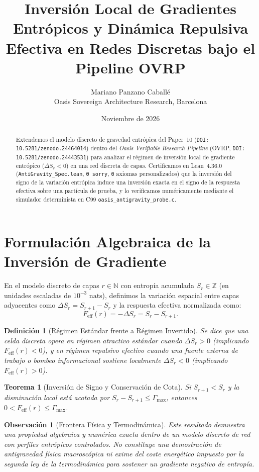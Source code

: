 \documentclass[11pt,a4paper]{article}
\title{Inversi\'on Local de Gradientes Entr\'opicos y Din\'amica Repulsiva Efectiva en Redes Discretas bajo el Pipeline OVRP}
\author{Mariano Panzano Caball\'e \\ \small Oasis Sovereign Architecture Research, Barcelona}
\date{Noviembre de 2026}
\newtheorem{definition}{Definici\'on}
\newtheorem{theorem}{Teorema}
\newtheorem{remark}{Observaci\'on}
\begin{document}
\maketitle

\begin{abstract}
Extendemos el modelo discreto de gravedad entr\'opica del Paper~10 (\texttt{DOI: 10.5281/zenodo.24464014}) dentro del \emph{Oasis Verifiable Research Pipeline} (OVRP, \texttt{DOI: 10.5281/zenodo.24443531}) para analizar el r\'egimen de inversi\'on local de gradiente entr\'opico ($\Delta S_r < 0$) en una red discreta de capas. Certificamos en Lean~4.36.0 (\texttt{AntiGravity\_Spec.lean}, \texttt{0 sorry}, \texttt{0} axiomas personalizados) que la inversi\'on del signo de la variaci\'on entr\'opica induce una inversi\'on exacta en el signo de la respuesta efectiva sobre una part\'icula de prueba, y lo verificamos num\'ericamente mediante el simulador determinista en C99 \texttt{oasis\_antigravity\_probe.c}.
\end{abstract}

\section{Formulación Algebraica de la Inversión de Gradiente}
En el modelo discreto de capas $r \in \mathbb{N}$ con entrop\'ia acumulada $S_r \in \mathbb{Z}$ (en unidades escaladas de $10^{-3}\text{ nats}$), definimos la variaci\'on espacial entre capas adyacentes como $\Delta S_r = S_{r+1} - S_r$ y la respuesta efectiva normalizada como:
\[
F_{\mathrm{eff}}(r) = -\Delta S_r = S_r - S_{r+1}.
\]

\begin{definition}[Régimen Estándar frente a Régimen Invertido]
Se dice que una celda discreta opera en r\'egimen atractivo est\'andar cuando $\Delta S_r > 0$ (implicando $F_{\mathrm{eff}}(r) < 0$), y en r\'egimen repulsivo efectivo cuando una fuente externa de trabajo o bombeo informacional sostiene localmente $\Delta S_r < 0$ (implicando $F_{\mathrm{eff}}(r) > 0$).
\end{definition}

\begin{theorem}[Inversión de Signo y Conservación de Cota]
Si $S_{r+1} < S_r$ y la disminuci\'on local est\'a acotada por $S_r - S_{r+1} \le \Gamma_{\max}$, entonces $0 < F_{\mathrm{eff}}(r) \le \Gamma_{\max}$.
\end{theorem}

\begin{remark}[Frontera Física y Termodinámica]
Este resultado demuestra una propiedad algebraica y num\'erica exacta dentro de un modelo discreto de red con perfiles entr\'opicos controlados. No constituye una demostraci\'on de antigravedad f\'isica macrosc\'opica ni exime del coste energ\'etico impuesto por la segunda ley de la termodin\'amica para sostener un gradiente negativo de entrop\'ia.
\end{remark}
\end{document}
